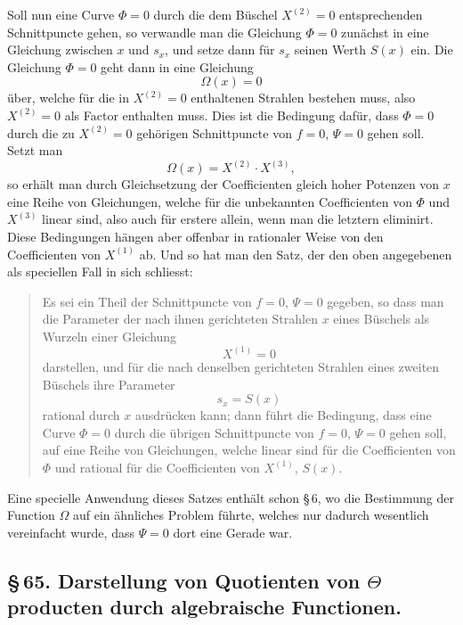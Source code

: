\documentclass[10pt]{article}
\begin{document}
Soll nun eine Curve \(\Phi=0\) durch die dem Büschel \(X^{(2)}=0\) entsprechenden Schnittpuncte gehen, so verwandle man die Gleichung \(\Phi=0\) zunächst in eine Gleichung zwischen \(x\) und \(s_x\), und setze dann für \(s_x\) seinen Werth \(S(x)\) ein. Die Gleichung \(\Phi=0\) geht dann in eine Gleichung
\[
\Omega(x)=0
\]
über, welche für die in \(X^{(2)}=0\) enthaltenen Strahlen bestehen muss, also \(X^{(2)}=0\) als Factor enthalten muss. Dies ist die Bedingung dafür, dass \(\Phi=0\) durch die zu \(X^{(2)}=0\) gehörigen Schnittpuncte von \(f=0\), \(\Psi=0\) gehen soll. Setzt man
\[
\Omega(x)=X^{(2)}\cdot X^{(3)},
\]
so erhält man durch Gleichsetzung der Coefficienten gleich hoher Potenzen von \(x\) eine Reihe von Gleichungen, welche für die unbekannten Coefficienten von \(\Phi\) und \(X^{(3)}\) linear sind, also auch für erstere allein, wenn man die letztern eliminirt. Diese Bedingungen hängen aber offenbar in rationaler Weise von den Coefficienten von \(X^{(1)}\) ab. Und so hat man den Satz, der den oben angegebenen als speciellen Fall in sich schliesst:

\begin{quote}
Es sei ein Theil der Schnittpuncte von \(f=0\), \(\Psi=0\) gegeben, so dass man die Parameter der nach ihnen gerichteten Strahlen \(x\) eines Büschels als Wurzeln einer Gleichung
\[
X^{(1)}=0
\]
darstellen, und für die nach denselben gerichteten Strahlen eines zweiten Büschels ihre Parameter
\[
s_x=S(x)
\]
rational durch \(x\) ausdrücken kann; dann führt die Bedingung, dass eine Curve \(\Phi=0\) durch die übrigen Schnittpuncte von \(f=0\), \(\Psi=0\) gehen soll, auf eine Reihe von Gleichungen, welche linear sind für die Coefficienten von \(\Phi\) und rational für die Coefficienten von \(X^{(1)}\), \(S(x)\).
\end{quote}

Eine specielle Anwendung dieses Satzes enthält schon \S\,6, wo die Bestimmung der Function \(\Omega\) auf ein ähnliches Problem führte, welches nur dadurch wesentlich vereinfacht wurde, dass \(\Psi=0\) dort eine Gerade war.

\subsection*{\S\,65. Darstellung von Quotienten von \(\Theta\)producten durch algebraische Functionen.}
\end{document}
